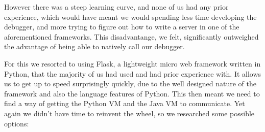 \documentclass[11pt, a4paper]{article}
\begin{document}
However there was a steep learning curve, and none of us had any prior
experience, which would have meant we would spending less time developing the
debugger, and more trying to figure out how to write a server in one of the
aforementioned frameworks.  This disadvantange, we felt, significantly
outweighed the advantage of being able to natively call our debugger.

For this we resorted to using Flask, a lightweight micro web framework written
in Python, that the majority of us had used and had prior experience with.  It
allows us to get up to speed surprisingly quickly, due to the well designed
nature of the framework and also the language features of Python.  This then
meant we need to find a way of getting the Python VM and the Java VM to
communicate.  Yet again we didn't have time to reinvent the wheel, so we
researched some possible options:
\end{document}
